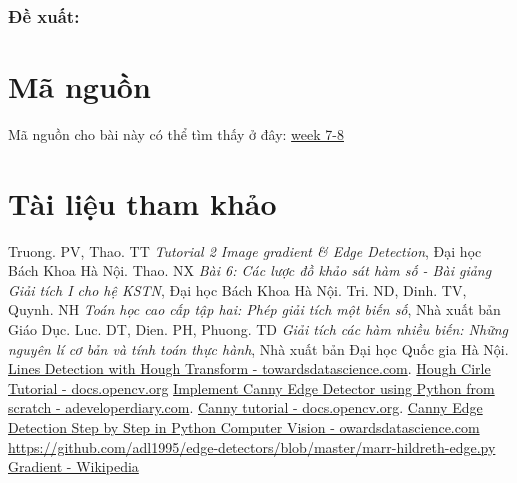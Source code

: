 \documentclass{article}
\begin{document}
    \subsubsection*{Đề xuất:} %
    \section{Mã nguồn}
    Mã nguồn cho bài này có thể tìm thấy ở đây: \href{https://github.com/thuantn210823/Computer-Vision-IPSAL-LAB-/tree/main/week%207-8}{week 7-8}

    \newpage
\section{Tài liệu tham khảo}
    \begin{thebibliography}{9}
        Truong. PV, Thao. TT \emph{Tutorial 2
        Image gradient \& Edge Detection}, Đại học Bách Khoa Hà Nội.
        Thao. NX \emph{Bài 6: Các lược đồ khảo sát hàm số - Bài giảng Giải tích I cho hệ KSTN}, Đại học Bách Khoa Hà Nội.
        Tri. ND, Dinh. TV, Quynh. NH \emph{Toán học cao cấp tập hai: Phép giải tích một biến số}, Nhà xuất bản Giáo Dục.
        Luc. DT, Dien. PH, Phuong. TD \emph{Giải tích các hàm nhiều biến: Những nguyên lí cơ bản và tính toán thực hành}, Nhà xuất bản Đại học Quốc gia Hà Nội.
    \href{https://towardsdatascience.com/lines-detection-with-hough-transform-84020b3b1549}{Lines Detection with Hough Transform - towardsdatascience.com}.
    \href{https://docs.opencv.org/4.x/d4/d70/tutorial_hough_circle.html}{Hough Cirle Tutorial - docs.opencv.org}
    \href{https://www.adeveloperdiary.com/data-science/computer-vision/implement-canny-edge-detector-using-python-from-scratch/}{Implement Canny Edge Detector using Python from scratch - adeveloperdiary.com}.
    \href{https://docs.opencv.org/4.x/da/d22/tutorial_py_canny.html}{Canny tutorial - docs.opencv.org}.
    \href{https://towardsdatascience.com/canny-edge-detection-step-by-step-in-python-computer-vision-b49c3a2d8123}{Canny Edge Detection Step by Step in Python Computer Vision - owardsdatascience.com}
    \url{https://github.com/adl1995/edge-detectors/blob/master/marr-hildreth-edge.py}
    \href{https://en.wikipedia.org/wiki/Gradient}{Gradient - Wikipedia}
    \end{thebibliography}
\end{document}
